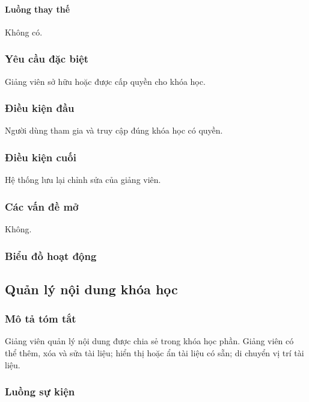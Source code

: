 \documentclass[./../main_file.tex]{subfiles}
\begin{document}
\paragraph{Luồng thay thế}
	Không có.

\subsubsection{Yêu cầu đặc biệt}
Giảng viên sở hữu hoặc được cấp quyền cho khóa học.

\subsubsection{Điều kiện đầu}
Người dùng tham gia và truy cập đúng khóa học có quyền.

\subsubsection{Điều kiện cuối}
Hệ thống lưu lại chỉnh sửa của giảng viên.

\subsubsection{Các vấn đề mở}
Không.

\subsubsection{Biểu đồ hoạt động}

\subsection{Quản lý nội dung khóa học}
\subsubsection{Mô tả tóm tắt}
Giảng viên quản lý nội dung được chia sẻ trong khóa học phần. Giảng viên có thể thêm, xóa và sửa tài liệu; hiển thị hoặc ẩn tài liệu có sẵn; di chuyển vị trí tài liệu.
\subsubsection{Luồng sự kiện}
\end{document}
